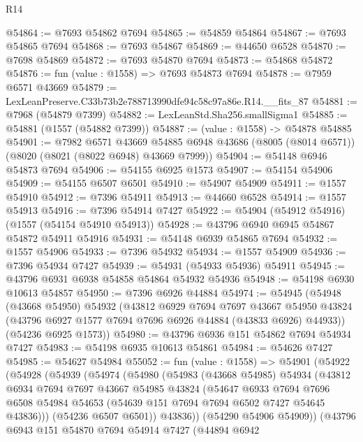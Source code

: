 \begin{lexlean}{R14}
\begin{coremodule}
@54864 := @7693 @54862 @7694
@54865 := @54859 @54864
@54867 := @7693 @54865 @7694
@54868 := @7693 @54867
@54869 := @44650 @6528
@54870 := @7698 @54869
@54872 := @7693 @54870 @7694
@54873 := @54868 @54872
@54876 := fun (value : @1558) => @7693 @54873 @7694
@54878 := @7959 @6571 @43669
@54879 := LexLeanPreserve.C33b73b2e788713990dfe94c58c97a86e.R14.__fits_87
@54881 := @7968 (@54879 @7399)
@54882 := LexLeanStd.Sha256.smallSigma1
@54885 := @54881 (@1557 (@54882 @7399))
@54887 := (value : @1558) -> @54878 @54885
@54901 := @7982
    @6571
    @43669
    @54885
    @6948
    @43686
    (@8005 (@8014 @6571))
    (@8020 (@8021 (@8022 @6948) @43669 @7999))
@54904 := @54148 @6946 @54873 @7694
@54906 := @54155 @6925 @1573
@54907 := @54154 @54906
@54909 := @54155 @6507 @6501
@54910 := @54907 @54909
@54911 := @1557 @54910
@54912 := @7396 @54911
@54913 := @44660 @6528
@54914 := @1557 @54913
@54916 := @7396 @54914 @7427
@54922 := @54904 (@54912 @54916) (@1557 (@54154 @54910 @54913))
@54928 := @43796 @6940 @6945 @54867 @54872 @54911 @54916
@54931 := @54148 @6939 @54865 @7694
@54932 := @1557 @54906
@54933 := @7396 @54932
@54934 := @1557 @54909
@54936 := @7396 @54934 @7427
@54939 := @54931 (@54933 @54936) @54911
@54945 := @43796 @6931 @6938 @54858 @54864 @54932 @54936
@54948 := @54198 @6930 @10613 @54857
@54950 := @7396 @6926 @44884
@54974 := @54945
    (@54948
      (@43668 @54950)
      @54932
      (@43812
        @6929
        @7694
        @7697
        @43667
        @54950
        @43824
        (@43796 @6927 @1577 @7694 @7696 @6926 @44884 (@43833 @6926) @44933))
      (@54236 @6925 @1573))
@54980 := @43796 @6936 @151 @54862 @7694 @54934 @7427
@54983 := @54198 @6935 @10613 @54861
@54984 := @54626 @7427
@54985 := @54627 @54984
@55052 := fun (value : @1558) =>
  @54901
    (@54922
      (@54928
        (@54939
          (@54974
            (@54980
              (@54983
                (@43668 @54985)
                @54934
                (@43812
                  @6934
                  @7694
                  @7697
                  @43667
                  @54985
                  @43824
                  (@54647
                    @6933
                    @7694
                    @7696
                    @6508
                    @54984
                    @54653
                    (@54639 @151 @7694 @7694 @6502 @7427 @54645 @43836)))
                (@54236 @6507 @6501))
              @43836))
          (@54290 @54906 @54909))
        (@43796
          @6943
          @151
          @54870
          @7694
          @54914
          @7427
          (@44894
            @6942

\end{coremodule}
\end{lexlean}
